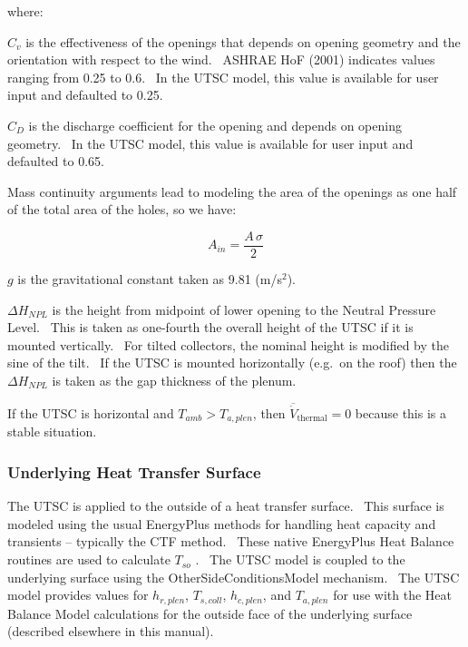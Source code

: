where:

\({C_v}\) is the effectiveness of the openings that depends on opening geometry and the orientation with respect to the wind.~ ASHRAE HoF (2001) indicates values ranging from 0.25 to 0.6.~ In the UTSC model, this value is available for user input and defaulted to 0.25.

\({C_D}\) is the discharge coefficient for the opening and depends on opening geometry.~ In the UTSC model, this value is available for user input and defaulted to 0.65.

Mass continuity arguments lead to modeling the area of the openings as one half of the total area of the holes, so we have:

\begin{equation}
{A_{in}} = \frac{{A\,\sigma }}{2}
\end{equation}

\(g\) is the gravitational constant taken as 9.81 (m/s\(^{2}\)).

\(\Delta {H_{NPL}}\) is the height from midpoint of lower opening to the Neutral Pressure Level.~ This is taken as one-fourth the overall height of the UTSC if it is mounted vertically.~ For tilted collectors, the nominal height is modified by the sine of the tilt.~ If the UTSC is mounted horizontally (e.g.~on the roof) then the \(\Delta {H_{NPL}}\) is taken as the gap thickness of the plenum.

If the UTSC is horizontal and \({T_{amb}} > {T_{a,plen}}\), then \({{\overline{\dot V}}_{{\mathrm{thermal}}}}{\mathrm{ = 0}}\) because this is a stable situation.

\subsubsection{Underlying Heat Transfer Surface}\label{underlying-heat-transfer-surface-000}

The UTSC is applied to the outside of a heat transfer surface.~ This surface is modeled using the usual EnergyPlus methods for handling heat capacity and transients -- typically the CTF method.~ These native EnergyPlus Heat Balance routines are used to calculate \({T_{so}}\) .~ The UTSC model is coupled to the underlying surface using the OtherSideConditionsModel mechanism.~ The UTSC model provides values for \({h_{r,plen}}\), \({T_{s,coll}}\), \({h_{c,plen}}\), and \({T_{a,plen}}\) for use with the Heat Balance Model calculations for the outside face of the underlying surface (described elsewhere in this manual).

